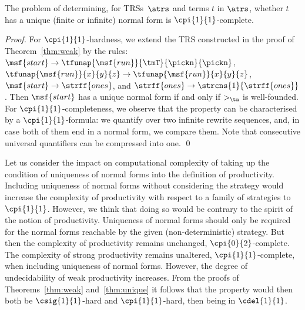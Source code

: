 \begin{theorem}\label{thm:unique}
The problem of determining, for TRSs~$\atrs$ and terms $t$ in $\atrs$, 
  whether $t$ has a unique (finite or infinite) normal form 
  is $\cpi{1}{1}$-complete.
\end{theorem}

\begin{proof}
  For $\cpi{1}{1}$-hardness, we extend the TRS constructed in the proof of Theorem~\ref{thm:weak} by the rules:
  $\msf{start} \to \tfunap{\msf{run}}{\tmT}{\pickn}{\pickn}$,
  $\tfunap{\msf{run}}{x}{y}{z} \to \tfunap{\msf{run}}{x}{y}{z}$,
  $\msf{start} \to \strff{ones}$, and
  $\strff{ones} \to \strcns{1}{\strff{ones}}$.
  Then $\msf{start}$ has a unique normal form 
  if and only if $>_\tm$ is well-founded.
  For $\cpi{1}{1}$-completeness, we observe that
  the property can be characterised by a $\cpi{1}{1}$-formula:
  we quantify over two infinite rewrite sequences, 
  and, in case both of them end in a normal form, we compare them.
  Note that consecutive universal quantifiers can be compressed into one. \qed
\end{proof}

Let us consider the impact on computational complexity 
of taking up the condition of uniqueness of normal forms
into the definition of productivity.
Including uniqueness of normal forms without considering the strategy
would increase the complexity of productivity with respect to a family of strategies to $\cpi{1}{1}$.
However, we think that doing so would be contrary to the spirit 
of the notion of productivity.
Uniqueness of normal forms should only be required 
for the normal forms
reachable by the given (non-deterministic) strategy.
But then the complexity of productivity remains unchanged,
$\cpi{0}{2}$-complete.
The complexity of strong productivity
remains unaltered, $\cpi{1}{1}$-complete,
when including uniqueness of normal forms.
However, the degree of undecidability of weak productivity increases.
From the proofs of Theorems~\ref{thm:weak} and~\ref{thm:unique}
it follows that the property would then both be
$\csig{1}{1}$-hard and $\cpi{1}{1}$-hard,
then being in $\cdel{1}{1}$.

